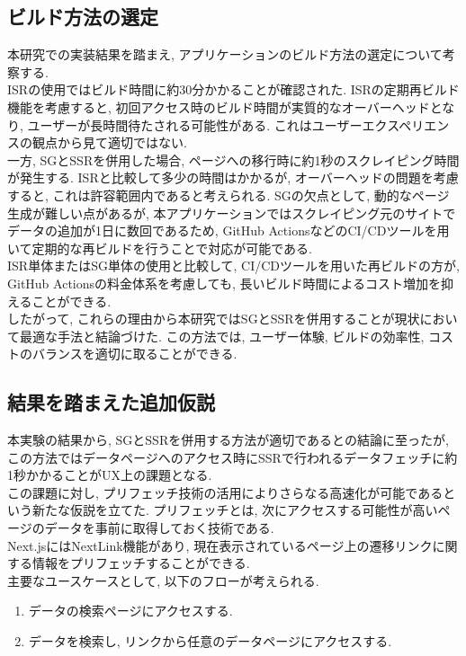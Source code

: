 \subsection{ビルド方法の選定}
本研究での実装結果を踏まえ, アプリケーションのビルド方法の選定について考察する. \\
ISRの使用ではビルド時間に約30分かかることが確認された. 
ISRの定期再ビルド機能を考慮すると, 初回アクセス時のビルド時間が実質的なオーバーヘッドとなり, ユーザーが長時間待たされる可能性がある. 
これはユーザーエクスペリエンスの観点から見て適切ではない. \\
一方, SGとSSRを併用した場合, ページへの移行時に約1秒のスクレイピング時間が発生する. 
ISRと比較して多少の時間はかかるが, オーバーヘッドの問題を考慮すると, これは許容範囲内であると考えられる. 
SGの欠点として, 動的なページ生成が難しい点があるが, 本アプリケーションではスクレイピング元のサイトでデータの追加が1日に数回であるため, GitHub ActionsなどのCI/CDツールを用いて定期的な再ビルドを行うことで対応が可能である. \\
ISR単体またはSG単体の使用と比較して, CI/CDツールを用いた再ビルドの方が, GitHub Actionsの料金体系を考慮しても, 長いビルド時間によるコスト増加を抑えることができる. \\
したがって, これらの理由から本研究ではSGとSSRを併用することが現状において最適な手法と結論づけた. 
この方法では, ユーザー体験, ビルドの効率性, コストのバランスを適切に取ることができる. 


\subsection{結果を踏まえた追加仮説}
本実験の結果から, SGとSSRを併用する方法が適切であるとの結論に至ったが, この方法ではデータページへのアクセス時にSSRで行われるデータフェッチに約1秒かかることがUX上の課題となる. \\
この課題に対し, プリフェッチ技術の活用によりさらなる高速化が可能であるという新たな仮説を立てた. 
プリフェッチとは, 次にアクセスする可能性が高いページのデータを事前に取得しておく技術である. \\
Next.jsにはNextLink機能があり, 現在表示されているページ上の遷移リンクに関する情報をプリフェッチすることができる. \\
主要なユースケースとして, 以下のフローが考えられる.

\begin{enumerate}
	\item データの検索ページにアクセスする.
	\item データを検索し, リンクから任意のデータページにアクセスする.
\end{enumerate}

